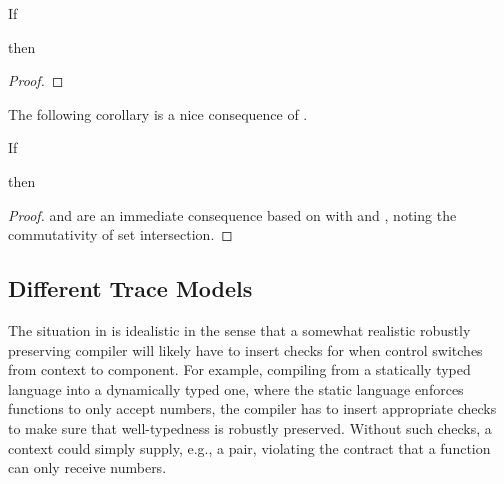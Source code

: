 \documentclass[a4paper,12pt]{article}
\begin{document}
\begin{lemma}{}
  If 
  \begin{assumptions}
  \end{assumptions}
  then
  \begin{goals}
  \end{goals}
\end{lemma}
\begin{proof}
  \incompleteProof
\end{proof}
The following corollary is a nice consequence of .
\begin{corollary}{}
  If 
  \begin{assumptions}
  \end{assumptions}
  then
  \begin{goals}
  \end{goals}
\end{corollary}
\begin{proof}
   and  are an immediate consequence based on  with  and , noting the commutativity of set intersection.
\end{proof}

\subsection{Different Trace Models}\label{subsec:rtpc-different-trace-models}

The situation in  is idealistic in the sense that a somewhat realistic robustly preserving compiler will likely have to insert checks for when control switches from context to component.
For example, compiling from a statically typed language into a dynamically typed one, where the static language enforces functions to only accept numbers, the compiler has to insert appropriate checks to make sure that well-typedness is robustly preserved.
Without such checks, a context could simply supply, e.g., a pair, violating the contract that a function can only receive numbers.
\end{document}

